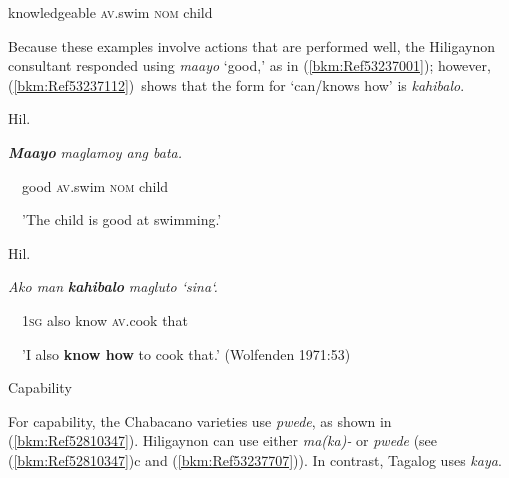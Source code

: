 \begin{styleStandard}
knowledgeable \textsc{av}.swim \textsc{nom} child
\end{styleStandard}

\begin{styleStandard}
Because these examples involve actions that are performed well, the Hiligaynon consultant responded using \textit{maayo} ‘good,’ as in (\ref{bkm:Ref53237001}); however, (\ref{bkm:Ref53237112})\ shows that the form for ‘can/knows how’ is \textit{kahibalo}. 
\end{styleStandard}

\begin{listWWNumiileveli}
\item 
\begin{stylelsLanginfo}
\label{bkm:Ref53237001}Hil.
\end{stylelsLanginfo}
\end{listWWNumiileveli}
\begin{stylelsLanginfo}
\textbf{\textit{Maayo}}\textit{ maglamoy ang bata.}
\end{stylelsLanginfo}

\begin{stylelsIMT}
\ \ good \textsc{av}.swim \textsc{nom} child
\end{stylelsIMT}

\begin{stylelsLanginfo}
\ \ {}'The child is good at swimming.'
\end{stylelsLanginfo}

\begin{listWWNumiileveli}
\item 
\begin{stylelsLanginfo}
\label{bkm:Ref53237112}Hil.
\end{stylelsLanginfo}
\end{listWWNumiileveli}
\begin{stylelsLanginfo}
\textit{Ako man }\textbf{\textit{kahibalo}}\textit{ magluto ‘sina‘.}
\end{stylelsLanginfo}

\begin{stylelsIMT}
\ \ 1\textsc{sg} also know \textsc{av}.cook that
\end{stylelsIMT}

\begin{stylelsLanginfo}
\ \ {}'I also \textbf{know how} to cook that.' (Wolfenden 1971:53)
\end{stylelsLanginfo}


\setcounter{listWWNumiiileveli}{0}
\begin{listWWNumiiileveli}
\item 
\begin{stylelsSectioniii}
Capability
\end{stylelsSectioniii}
\end{listWWNumiiileveli}
\begin{styleStandard}
For capability, the Chabacano varieties use \textit{pwede}, as shown in (\ref{bkm:Ref52810347}). Hiligaynon can use either \textit{ma(ka)-} or \textit{pwede} (see (\ref{bkm:Ref52810347})c and (\ref{bkm:Ref53237707})). In contrast, Tagalog uses \textit{kaya}.
\end{styleStandard}


